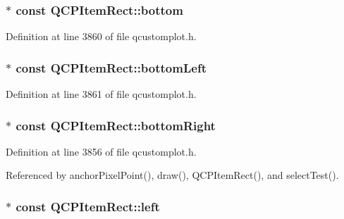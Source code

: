 \subsubsection[{bottom}]{$\ast$ const Q\+C\+P\+Item\+Rect\+::bottom}\label{class_q_c_p_item_rect_a99313bf2b338d9f81e19bd38082038aa}


Definition at line 3860 of file qcustomplot.\+h.

\hypertarget{class_q_c_p_item_rect_abd8ee63fdf81f0c74bf7ccadee8603da}{}
\subsubsection[{bottom\+Left}]{$\ast$ const Q\+C\+P\+Item\+Rect\+::bottom\+Left}\label{class_q_c_p_item_rect_abd8ee63fdf81f0c74bf7ccadee8603da}


Definition at line 3861 of file qcustomplot.\+h.

\hypertarget{class_q_c_p_item_rect_a409f3bfe615a7e322bb3d4d193d85b26}{}
\subsubsection[{bottom\+Right}]{$\ast$ const Q\+C\+P\+Item\+Rect\+::bottom\+Right}\label{class_q_c_p_item_rect_a409f3bfe615a7e322bb3d4d193d85b26}


Definition at line 3856 of file qcustomplot.\+h.



Referenced by anchor\+Pixel\+Point(), draw(), Q\+C\+P\+Item\+Rect(), and select\+Test().

\hypertarget{class_q_c_p_item_rect_aad0ca1af0c8debfc20d7b47fc942764d}{}
\subsubsection[{left}]{$\ast$ const Q\+C\+P\+Item\+Rect\+::left}\label{class_q_c_p_item_rect_aad0ca1af0c8debfc20d7b47fc942764d}


